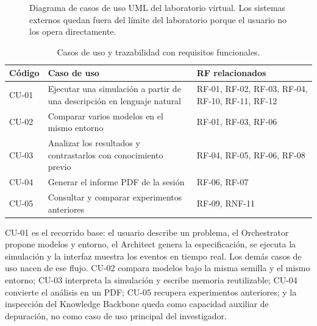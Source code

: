 \begin{figure}[H]
{}
\caption[Diagrama de casos de uso]{Diagrama de casos de uso UML del
laboratorio virtual. Los sistemas externos quedan fuera del límite del laboratorio
porque el usuario no los opera directamente.}
\label{fig:casos-uso}
\end{figure}

\begin{table}[H]
\begin{center}
\small
\setlength{\tabcolsep}{6pt}
\renewcommand{\arraystretch}{1.2}
\begin{tabular}{|>{\raggedright\arraybackslash}p{1.35cm}|>{\raggedright\arraybackslash}p{6.05cm}|>{\raggedright\arraybackslash}p{2.75cm}|} \hline
\textbf{Código} & \textbf{Caso de uso} & \textbf{RF relacionados} \\ \hline
CU-01 & Ejecutar una simulación a partir de una descripción en lenguaje natural & RF-01, RF-02, RF-03, RF-04, RF-10, RF-11, RF-12 \\ \hline
CU-02 & Comparar varios modelos en el mismo entorno & RF-01, RF-03, RF-06 \\ \hline
CU-03 & Analizar los resultados y contrastarlos con conocimiento previo & RF-04, RF-05, RF-06, RF-08 \\ \hline
CU-04 & Generar el informe PDF de la sesión & RF-06, RF-07 \\ \hline
CU-05 & Consultar y comparar experimentos anteriores & RF-09, RNF-11 \\ \hline
\end{tabular}
\caption[Casos de uso]{Casos de uso y trazabilidad con requisitos
funcionales.}
\end{center}
\end{table}

CU-01 es el recorrido base: el usuario describe un problema, el Orchestrator
propone modelos y entorno, el Architect genera la especificación, se ejecuta la
simulación y la interfaz muestra los eventos en tiempo real. Los demás casos
de uso nacen de ese flujo. CU-02 compara modelos bajo la misma semilla y el
mismo entorno; CU-03 interpreta la simulación y escribe memoria reutilizable;
CU-04 convierte el análisis en un PDF; CU-05 recupera experimentos anteriores;
y la inspección del Knowledge Backbone queda como capacidad auxiliar de
depuración, no como caso de uso principal del investigador.

